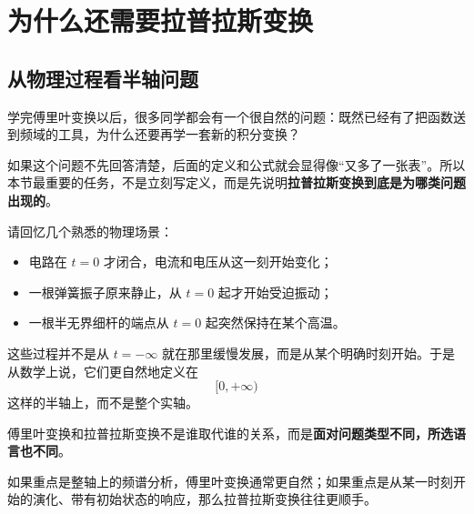 \section{为什么还需要拉普拉斯变换}

\subsection{从物理过程看半轴问题}

学完傅里叶变换以后，很多同学都会有一个很自然的问题：既然已经有了把函数送到频域的工具，为什么还要再学一套新的积分变换？

如果这个问题不先回答清楚，后面的定义和公式就会显得像``又多了一张表''。所以本节最重要的任务，不是立刻写定义，而是先说明\textbf{拉普拉斯变换到底是为哪类问题出现的}。

请回忆几个熟悉的物理场景：
\begin{itemize}
    \item 电路在 $t=0$ 才闭合，电流和电压从这一刻开始变化；
    \item 一根弹簧振子原来静止，从 $t=0$ 起才开始受迫振动；
    \item 一根半无界细杆的端点从 $t=0$ 起突然保持在某个高温。
\end{itemize}

这些过程并不是从 $t=-\infty$ 就在那里缓慢发展，而是从某个明确时刻开始。于是从数学上说，它们更自然地定义在
\[
    [0,+\infty)
\]
这样的半轴上，而不是整个实轴。

\begin{tishi}[本节最重要的观念]
傅里叶变换和拉普拉斯变换不是谁取代谁的关系，而是\textbf{面对问题类型不同，所选语言也不同}。

如果重点是整轴上的频谱分析，傅里叶变换通常更自然；如果重点是从某一时刻开始的演化、带有初始状态的响应，那么拉普拉斯变换往往更顺手。
\end{tishi}

